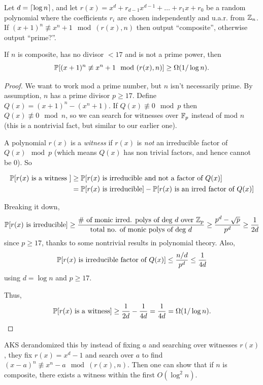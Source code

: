 \documentclass[11 pt]{scrartcl}
\begin{document}
Let $d = \lceil\log n\rceil$, and let $r(x) = x^d + r_{d-1}x^{d-1} + \dots + r_1x + r_0$ be a random polynomial where the coefficients $r_i$ are chosen independently and u.a.r. from $\mathbb Z_n$. If $(x+1)^n \not\equiv x^n + 1 \mod{(r(x), n)}$ then output ``composite'', otherwise output ``prime?''.

\begin{claim}
    If $n$ is composite, has no divisor $<17$ and is not a prime power, then 
    \[ \mathbb P[(x+1)^n \not\equiv x^n + 1 \mod{(r(x), n)}] \geq \Omega(1/\log n).\] 
\end{claim}
\begin{proof}
    We want to work mod a prime number, but $n$ isn't necessarily prime. By assumption, $n$ has a prime divisor $p \geq 17$. Define $Q(x) = (x+1)^n - (x^n + 1)$. If $Q(x) \not\equiv 0 \mod p$ then $Q(x) \not\equiv 0 \mod n$, so we can search for witnesses over $\mathbb F_p$ instead of mod $n$ (this is a nontrivial fact, but similar to our earlier one). 

    A polynomial $r(x)$ is a \emph{witness} if $r(x)$ is \emph{not} an irreducible factor of $Q(x) \mod p$ (which means $Q(x)$ has non trivial factors, and hence cannot be 0). So 

    \begin{align*}
        \mathbb P[r(x)\text{ is a witness }] &\geq \mathbb P[r(x) \text{ is irreducible and not a factor of } Q(x)] \\ 
                                       &= \mathbb P[r(x)\text{ is irreducible}] - \mathbb P[r(x)\text{ is an irred factor of }Q(x)] \\ 
    \end{align*}

    Breaking it down, 
    \begin{align*}
        \mathbb P[r(x)\text{ is irreducible}] \geq \dfrac{\text{\# of monic irred. polys of deg } d \text{ over } \mathbb Z_p}{\text{total no. of monic polys of deg }d} \geq \dfrac{p^d - \sqrt{p}}{p^d} \geq \dfrac{1}{2d} 
    \end{align*}
    since $p \geq 17$, thanks to some nontrivial results in polynomial theory. Also, 
    \[ \mathbb P[r(x)\text{ is irreducible factor of }Q(x)] \leq \dfrac{n/d}{p^d} \leq \dfrac{1}{4d}\] 
    using $d = \log n$ and $p \geq 17$. 

    Thus, 
    \[ \mathbb P[r(x) \text{ is a witness}] \geq \dfrac{1}{2d} - \dfrac{1}{4d} = \dfrac{1}{4d} = \Omega(1/\log n).\] 
\end{proof}

AKS derandomized this by instead of fixing $a$ and searching over witnesses $r(x)$, they fix $r(x) = x^d - 1$ and search over $a$ to find $(x-a)^n \not\equiv x^n - a \mod (r(x), n)$. Then one can show that if $n$ is composite, there exists a witness within the first $O(\log^2 n)$. 
\end{document}
